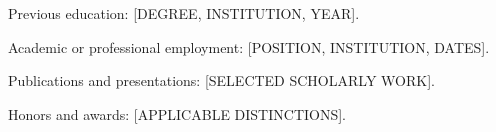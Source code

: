 \noindent Previous education: [DEGREE, INSTITUTION, YEAR].

\noindent Academic or professional employment: [POSITION, INSTITUTION, DATES].

\noindent Publications and presentations: [SELECTED SCHOLARLY WORK].

\noindent Honors and awards: [APPLICABLE DISTINCTIONS].
